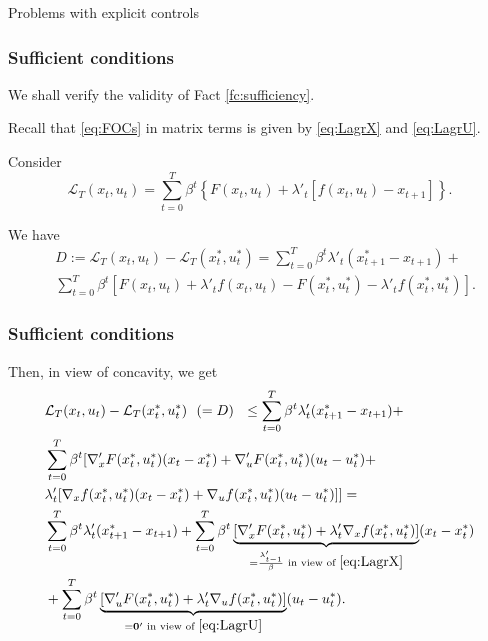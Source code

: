 \documentclass[10pt]{beamer}
\theoremstyle{definition}
\begin{document}
\begin{section}{Problems with explicit controls}
\begin{frame}[fragile]
\frametitle{Sufficient conditions}
We shall verify the validity of Fact \ref{fc:sufficiency}.\bigskip

Recall that \eqref{eq:FOCs} in matrix terms is given by \eqref{eq:LagrX} and \eqref{eq:LagrU}.

Consider \[ \mathcal{L}_T(x_t,u_t) = \sum_{t=0}^{T}\beta^t \left\{ F(x_t,u_t) + \lambda'_t  [f(x_t,u_t)-x_{t+1}] \right\} .\]

We have \begin{equation}
\begin{split}
& D := \mathcal{L}_T (x_t,u_t) - \mathcal{L}_T(x^*_t,u^*_t) = \sum_{t=0}^{T}\beta^t \lambda'_t  (x^*_{t+1} - x_{t+1} )+  \\
& \sum_{t=0}^{T}\beta^t [ F(x_t,u_t) + \lambda'_t  f(x_t,u_t) 
- F(x^*_t,u^*_t) - \lambda'_t  f(x^*_t,u^*_t) ].
\end{split}
\label{eq:LagrDiff}
\end{equation}
\end{frame}


\begin{frame}[fragile]
\frametitle{Sufficient conditions}
Then, in view of concavity, we get \begin{equation*}
\begin{split}
&\mathcal{L}_T (x_t,u_t) - \mathcal{L}_T(x^*_t,u^*_t) ~~(= D)~~ \leq \sum_{t=0}^{T}\beta^t \lambda'_t  (x^*_{t+1} - x_{t+1} )+  \\
&\sum_{t=0}^{T}\beta^t [ \nabla'_x F(x^*_t,u^*_t)(x_t-x_t^*) + \nabla'_u F(x^*_t,u^*_t) (u_t-u_t^*) +\\
& \lambda'_t  [\nabla_x f(x^*_t,u^*_t)(x_t-x_t^*) + \nabla_u f(x^*_t,u^*_t) (u_t-u_t^*) ]] = \\
& \sum_{t=0}^{T}\beta^t \lambda'_t  (x^*_{t+1} - x_{t+1} )+  \sum_{t=0}^{T}\beta^t \underbrace{[\nabla'_x F(x^*_t,u^*_t) + \lambda'_t  \nabla_x f(x^*_t,u^*_t)]}_{=\frac{\lambda'_{t-1}}{\beta} \text{ in view of }  \eqref{eq:LagrX} } (x_t-x_t^*)\\
& + \sum_{t=0}^{T}\beta^t \underbrace{[\nabla'_u F(x^*_t,u^*_t) + \lambda'_t  \nabla_u f(x^*_t,u^*_t)]}_{=\mathbf{0}' \text{ in view of } \eqref{eq:LagrU}} (u_t-u_t^*).
\end{split}
\end{equation*}
\end{frame}




\end{section}
\end{document}
